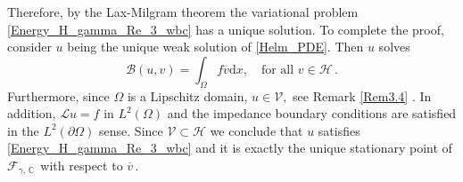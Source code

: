 \documentclass[twoside,11pt]{article}
\def\d{{\mathrm d}}
\def\C{{\mathbb C}}
\def\L{{\mathscr{L}}}
\def\vbar{\overline{v}}
\def\Bc{{\mathcal B}}
\def\Hc{{\mathscr H}}
\def\Vc{{\mathscr V}}
\def\L{{\mathscr{L}}}
\begin{document}
{Therefore, by the Lax-Milgram theorem \cite[Section~1, Chapter~VII]{Dautray_Lions_v2_1988} the variational problem 
\eqref{Energy_H_gamma_Re_3_wbc} has a unique solution. 
To complete the proof, consider $u$ being the unique weak solution of \eqref{Helm_PDE}. Then $u$ solves 
 \begin{equation*}
  \Bc(u,v) = \int_{\Omega   } f   \overline{v}   \d  x, \quad \text{for all } v\in \Hc\, . 
\end{equation*}
Furthermore, since $\Omega $ is a Lipschitz domain, $u \in \Vc, $ see Remark \ref{Rem3.4}    . In addition, 
$\L u =f$ in $L^2 (\Omega) $ and the impedance boundary conditions are satisfied in the $L^2 ( \partial \Omega) $
sense. Since $\Vc \subset \Hc $ we conclude that  $u$ satisfies \eqref{Energy_H_gamma_Re_3_wbc} and it is exactly the unique stationary point of $ \mathcal{F}_{\gamma,\,  \C \, }$ with respect to $\vbar\, .$



}
\end{document}
